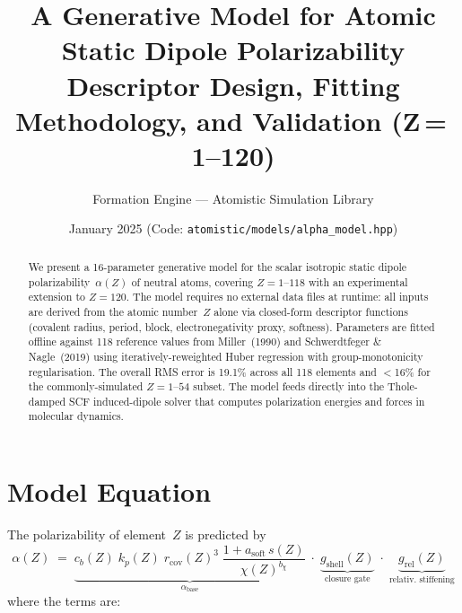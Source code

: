 \documentclass[11pt,letterpaper]{article}
\title{\textbf{A Generative Model for Atomic Static Dipole Polarizability}\\[4pt]
\large Descriptor Design, Fitting Methodology, and Validation (Z\,=\,1--120)}
\author{Formation Engine --- Atomistic Simulation Library}
\date{January 2025 \quad (Code: \texttt{atomistic/models/alpha\_model.hpp})}
\newcommand{\rcov}{r_{\mathrm{cov}}}
\newcommand{\kp}{k_p}
\newcommand{\cb}{c_b}
\newcommand{\asoft}{a_{\mathrm{soft}}}
\newcommand{\bchi}{b_\chi}
\begin{document}
\maketitle

\begin{abstract}
We present a 16-parameter generative model for the scalar isotropic static
dipole polarizability~$\alpha(Z)$ of neutral atoms, covering $Z=1$--$118$
with an experimental extension to $Z=120$.  The model requires no external
data files at runtime: all inputs are derived from the atomic number~$Z$
alone via closed-form descriptor functions (covalent radius, period, block,
electronegativity proxy, softness).  Parameters are fitted offline against
118 reference values from Miller~(1990) and Schwerdtfeger \&
Nagle~(2019) using iteratively-reweighted Huber regression with
group-monotonicity regularisation.  The overall RMS error is 19.1\% across
all 118 elements and $<$16\% for the commonly-simulated $Z=1$--$54$ subset.
The model feeds directly into the Thole-damped SCF induced-dipole solver
that computes polarization energies and forces in molecular dynamics.
\end{abstract}

\section{Model Equation}
\label{sec:model}

The polarizability of element~$Z$ is predicted by
\begin{equation}
\boxed{\;
\alpha(Z) \;=\; \underbrace{\cb(Z)\;\kp(Z)\;\rcov(Z)^{3}\;
\frac{1 + \asoft\,s(Z)}{\chi(Z)^{\bchi}}}_{\alpha_{\text{base}}}
\;\cdot\; \underbrace{g_{\text{shell}}(Z)}_{\text{closure gate}}
\;\cdot\; \underbrace{g_{\text{rel}}(Z)}_{\text{relativ.\ stiffening}}
\;}
\label{eq:alpha}
\end{equation}
where the terms are:
\end{document}
